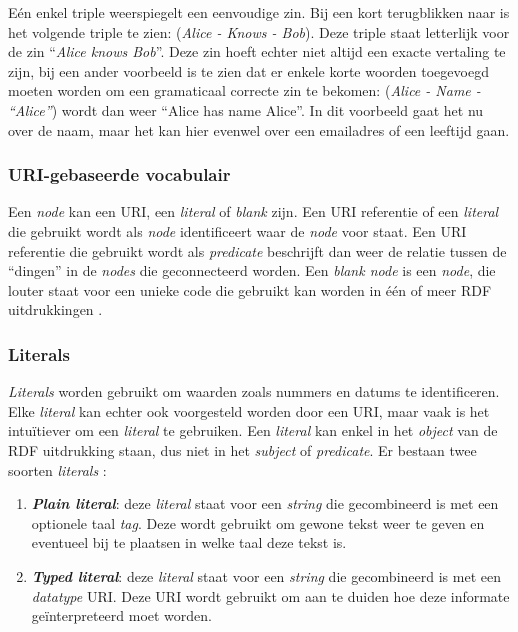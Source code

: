 Eén enkel triple weerspiegelt een eenvoudige zin. Bij een kort terugblikken naar  is het volgende triple te zien: (\textit{Alice - Knows - Bob}). Deze triple staat letterlijk voor de zin ``\textit{Alice knows Bob}''. Deze zin hoeft echter niet altijd een exacte vertaling te zijn, bij een ander voorbeeld is te zien dat er enkele korte woorden toegevoegd moeten worden om een gramaticaal correcte zin te bekomen: (\textit{Alice - Name - ``Alice''}) wordt dan weer ``Alice has name Alice''. In dit voorbeeld gaat het nu over de naam, maar het kan hier evenwel over een emailadres of een leeftijd gaan.

\subsubsection{URI-gebaseerde vocabulair}
Een \textit{node} kan een URI, een \textit{literal} of \textit{blank} zijn. Een URI referentie of een \textit{literal} die gebruikt wordt als \textit{node} identificeert waar de \textit{node} voor staat. Een URI referentie die gebruikt wordt als \textit{predicate} beschrijft dan weer de relatie tussen de ``dingen'' in de \textit{nodes} die geconnecteerd worden. Een \textit{blank node} is een \textit{node}, die louter staat voor een unieke code die gebruikt kan worden in één of meer RDF uitdrukkingen \cite{klyne2009resource}.

\subsubsection{Literals}
\textit{Literals} worden gebruikt om waarden zoals nummers en datums te identificeren. Elke \textit{literal} kan echter ook voorgesteld worden door een URI, maar vaak is het intuïtiever om een \textit{literal} te gebruiken. Een \textit{literal} kan enkel in het \textit{object} van de RDF uitdrukking staan, dus niet in het \textit{subject} of \textit{predicate}. Er bestaan twee soorten \textit{literals} \cite{klyne2009resource}:
\begin{enumerate}
    \item \textbf{\textit{Plain literal}}: deze \textit{literal} staat voor een \textit{string} die gecombineerd is met een optionele taal \textit{tag}. Deze wordt gebruikt om gewone tekst weer te geven en eventueel bij te plaatsen in welke taal deze tekst is.
    \item \textbf{\textit{Typed literal}}: deze \textit{literal} staat voor een \textit{string} die gecombineerd is met een \textit{datatype} URI. Deze URI wordt gebruikt om aan te duiden hoe deze informate geïnterpreteerd moet worden.
\end{enumerate}

